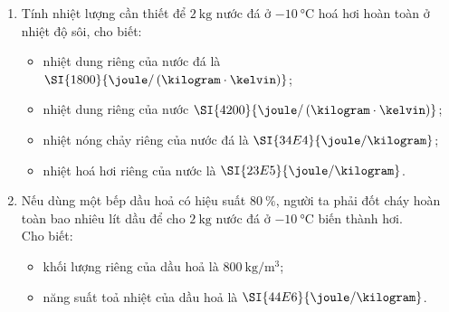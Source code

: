 	\begin{vd}
		\begin{enumerate}[label=\alph*)]
			\item Tính nhiệt lượng cần thiết để $\SI{2}{\kilogram}$ nước đá ở $\SI{-10}{\celsius}$ hoá hơi hoàn toàn ở nhiệt độ sôi, cho biết:
			\begin{itemize}
				\item nhiệt dung riêng của nước đá là $\SI{1800}{\joule/\left(\kilogram\cdot\kelvin\right)}$;
				\item nhiệt dung riêng của nước $\SI{4200}{\joule/\left(\kilogram\cdot\kelvin\right)}$;
				\item nhiệt nóng chảy riêng của nước đá là $\SI{34E4}{\joule/\kilogram}$;
				\item nhiệt hoá hơi riêng của nước là $\SI{23E5}{\joule/\kilogram}$.
			\end{itemize}
			\item Nếu dùng một bếp dầu hoả có hiệu suất $\SI{80}{\percent}$, người ta phải đốt cháy hoàn toàn bao nhiêu lít dầu để cho $\SI{2}{\kilogram}$ nước đá ở $\SI{-10}{\celsius}$ biến thành hơi.\\
			Cho biết:
			\begin{itemize}
				\item khối lượng riêng của dầu hoả là $\SI{800}{\kilogram/\meter^3}$;
				\item năng suất toả nhiệt của dầu hoả là $\SI{44E6}{\joule/\kilogram}$.
			\end{itemize}
		\end{enumerate}
\end{vd}
